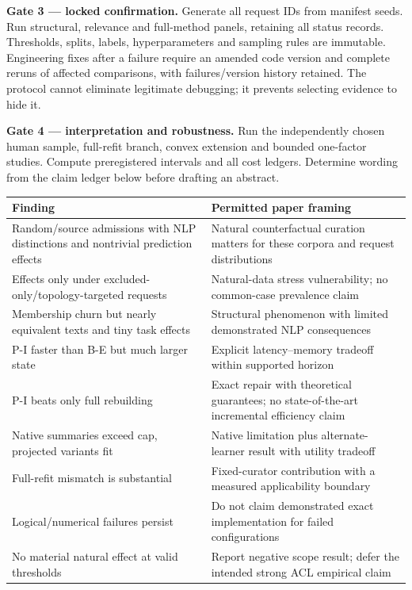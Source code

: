 \documentclass[11pt,a4paper]{article}
\newcommand{\smalltable}{\small\renewcommand{\arraystretch}{1.14}}
\begin{document}
\textbf{Gate 3 --- locked confirmation.} Generate all request IDs from manifest seeds. Run structural, relevance and full-method panels, retaining all status records. Thresholds, splits, labels, hyperparameters and sampling rules are immutable. Engineering fixes after a failure require an amended code version and complete reruns of affected comparisons, with failures/version history retained. The protocol cannot eliminate legitimate debugging; it prevents selecting evidence to hide it.

\textbf{Gate 4 --- interpretation and robustness.} Run the independently chosen human sample, full-refit branch, convex extension and bounded one-factor studies. Compute preregistered intervals and all cost ledgers. Determine wording from the claim ledger below before drafting an abstract.

{\smalltable
\begin{longtable}{p{.40\linewidth}p{.51\linewidth}}
\toprule Finding & Permitted paper framing\\\midrule\endhead
Random/source admissions with NLP distinctions and nontrivial prediction effects & Natural counterfactual curation matters for these corpora and request distributions\\
Effects only under excluded-only/topology-targeted requests & Natural-data stress vulnerability; no common-case prevalence claim\\
Membership churn but nearly equivalent texts and tiny task effects & Structural phenomenon with limited demonstrated NLP consequences\\
P-I faster than B-E but much larger state & Explicit latency--memory tradeoff within supported horizon\\
P-I beats only full rebuilding & Exact repair with theoretical guarantees; no state-of-the-art incremental efficiency claim\\
Native summaries exceed cap, projected variants fit & Native limitation plus alternate-learner result with utility tradeoff\\
Full-refit mismatch is substantial & Fixed-curator contribution with a measured applicability boundary\\
Logical/numerical failures persist & Do not claim demonstrated exact implementation for failed configurations\\
No material natural effect at valid thresholds & Report negative scope result; defer the intended strong ACL empirical claim\\
\bottomrule
\end{longtable}}
\end{document}
